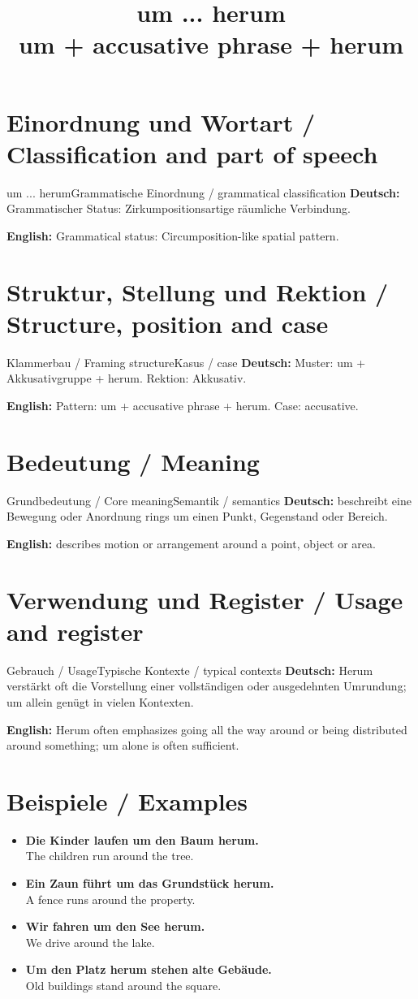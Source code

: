 \documentclass[a4paper,11pt]{article}
\title{um ... herum\\ \large um + accusative phrase + herum}
\date{}
\newcommand{\GermanText}[1]{\textbf{Deutsch: }#1\par}
\newcommand{\EnglishText}[1]{{\small\color{SoftGray}\textbf{English: }#1\par}}
\newcommand{\ExampleItem}[2]{\item \textbf{#1}\\{\small\color{SoftGray}#2}}
\begin{document}
\maketitle
\tableofcontents
\newpage
\section{Einordnung und Wortart / Classification and part of speech}
\begin{grammarentry}{um ... herum}{Grammatische Einordnung / grammatical classification}
\GermanText{Grammatischer Status: Zirkumpositionsartige räumliche Verbindung.}
\EnglishText{Grammatical status: Circumposition-like spatial pattern.}
\end{grammarentry}
\section{Struktur, Stellung und Rektion / Structure, position and case}
\begin{grammarentry}{Klammerbau / Framing structure}{Kasus / case}
\GermanText{Muster: um + Akkusativgruppe + herum. Rektion: Akkusativ.}
\EnglishText{Pattern: um + accusative phrase + herum. Case: accusative.}
\end{grammarentry}
\section{Bedeutung / Meaning}
\begin{grammarentry}{Grundbedeutung / Core meaning}{Semantik / semantics}
\GermanText{beschreibt eine Bewegung oder Anordnung rings um einen Punkt, Gegenstand oder Bereich.}
\EnglishText{describes motion or arrangement around a point, object or area.}
\end{grammarentry}
\section{Verwendung und Register / Usage and register}
\begin{grammarentry}{Gebrauch / Usage}{Typische Kontexte / typical contexts}
\GermanText{Herum verstärkt oft die Vorstellung einer vollständigen oder ausgedehnten Umrundung; um allein genügt in vielen Kontexten.}
\EnglishText{Herum often emphasizes going all the way around or being distributed around something; um alone is often sufficient.}
\end{grammarentry}
\section{Beispiele / Examples}
\begin{exbox}
\begin{itemize}
\ExampleItem{Die Kinder laufen um den Baum herum.}{The children run around the tree.}
\ExampleItem{Ein Zaun führt um das Grundstück herum.}{A fence runs around the property.}
\ExampleItem{Wir fahren um den See herum.}{We drive around the lake.}
\ExampleItem{Um den Platz herum stehen alte Gebäude.}{Old buildings stand around the square.}
\end{itemize}
\end{exbox}
\end{document}
